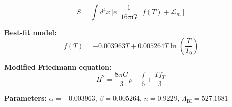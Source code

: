 
\begin{equation}
  S = \int d^4x \, |e| \, \frac{1}{16\pi G} \left[ f(T) + \mathcal{L}_m \right]
\end{equation}

\textbf{Best-fit model:}
\begin{equation}
  f(T) = -0.003963 T + 0.005264 T \ln\!\left(\frac{T}{T_0}\right)
\end{equation}

\textbf{Modified Friedmann equation:}
\begin{equation}
  H^2 = \frac{8\pi G}{3} \rho - \frac{f}{6} + \frac{T f_T}{3}
\end{equation}

\textbf{Parameters:}
$\alpha = -0.003963$, \quad
$\beta = 0.005264$, \quad
$n = 0.9229$, \quad
$\Lambda_{\text{BI}} = 527.1681$